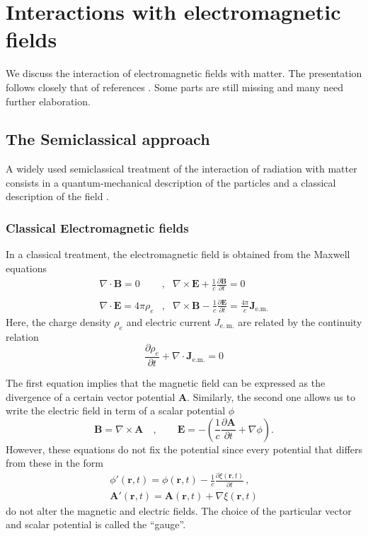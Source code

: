 \chapter{Interactions with electromagnetic fields}
\label{C:Inter-with-elect-field}

We discuss the interaction of electromagnetic fields with matter. The
presentation follows closely that of references
\autocite{Bethe1997AC_IQM,Townsen2000_AMA}. Some parts are still missing and many need further elaboration.

\section{The Semiclassical approach}
\label{S:Semic-appro}
A widely used semiclassical treatment of the interaction of radiation with matter consists in a quantum-mechanical description of the particles and a classical description of the field \autocite{Bethe1997AC_IQM}.

\subsection{Classical Electromagnetic fields}

In a classical treatment, the electromagnetic field is obtained from the Maxwell equations
\begin{eqnarray}\label{Q:Maxwe-eq}
\nabla \cdot \bm{B} = 0 &,& \nabla {\times} \bm{E} +
  \frac{1}{c}\frac{\partial \bm{B}}{\partial t} = 0 \nonumber \\ \\
  \nabla  \cdot \bm{E} = 4 \pi \rho_{e} &,&
\nabla {\times} \bm{B} - \frac{1}{c} \frac{\partial \bm{E}}{\partial t} =
\frac{4 \pi}{c} \bm{J}_{\mathrm{e.m.}} \nonumber
\end{eqnarray}
Here, the charge density $\rho_{e}$ and electric current $J_{\mathrm{e.~m.}}$ are related by the continuity relation
\[
\frac{\partial \rho_{e}}{\partial t} + \nabla \cdot
\bm{J}_{\mathrm{e.m.}}= 0
\]

The first equation implies that the magnetic field can be expressed as the divergence of a certain vector potential $\bm{A}$. Similarly, the second one allows us to write the electric field in term of a scalar potential $\phi$
\[
\bm{B} = \nabla {\times} \bm{A} \quad , \qquad \bm{E} = - \left( \frac{1}{c} \frac{\partial \bm{A}}{\partial t} + \nabla \phi \right) .
\]
%
However, these equations do not fix the potential since every potential
that differs from these in the form
%
\begin{align*}
  \phi'(\bm{r},t) = \phi(\bm{r},t) - \frac{1}{c} \frac{\partial \xi(\bm{r},t)}{\partial t} \,,\\
  \bm{A}'(\bm{r},t) = \bm{A}(\bm{r},t) +  \nabla \xi(\bm{r},t)
\end{align*}
do not alter the magnetic and electric fields. The choice of the particular vector and scalar potential is called the ``gauge''.

